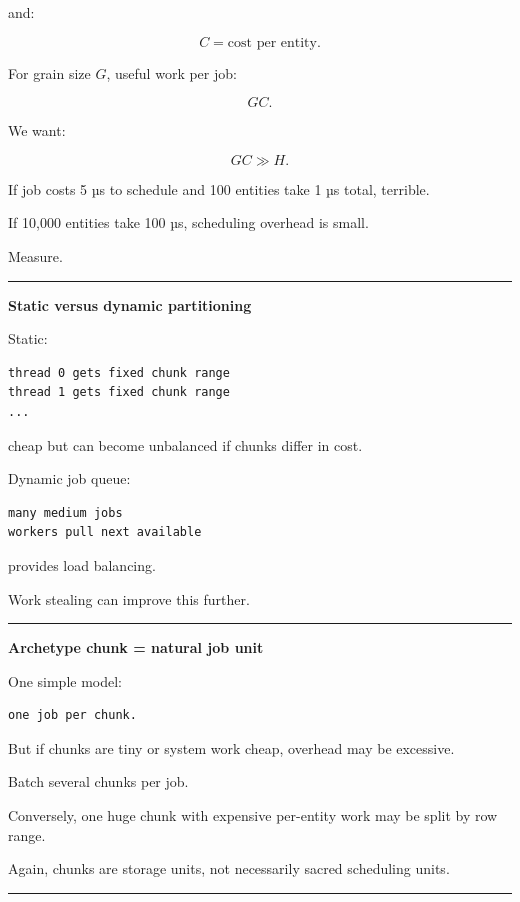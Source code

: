 and:

\[
C=
\text{cost per entity}.
\]

For grain size \(G\), useful work per job:

\[
GC.
\]

We want:

\[
\boxed{
GC\gg H.
}
\]

If job costs 5 µs to schedule and 100 entities take 1 µs total, terrible.

If 10,000 entities take 100 µs, scheduling overhead is small.

Measure.

\begin{center}\rule{0.5\linewidth}{0.5pt}\end{center}

\textbf{Static versus dynamic partitioning}

Static:

\begin{verbatim}
thread 0 gets fixed chunk range
thread 1 gets fixed chunk range
...
\end{verbatim}

cheap but can become unbalanced if chunks differ in cost.

Dynamic job queue:

\begin{verbatim}
many medium jobs
workers pull next available
\end{verbatim}

provides load balancing.

Work stealing can improve this further.

\begin{center}\rule{0.5\linewidth}{0.5pt}\end{center}

\textbf{Archetype chunk = natural job unit}

One simple model:

\begin{verbatim}
one job per chunk.
\end{verbatim}

But if chunks are tiny or system work cheap, overhead may be excessive.

Batch several chunks per job.

Conversely, one huge chunk with expensive per-entity work may be split by row range.

Again, chunks are storage units, not necessarily sacred scheduling units.

\begin{center}\rule{0.5\linewidth}{0.5pt}\end{center}

